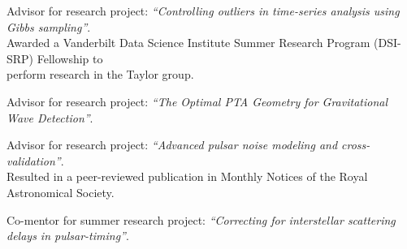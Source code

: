 \documentclass[11pt,letterpaper,sans]{moderncv}
\begin{document}
\vspace{-0.1cm}
\hspace{0.71cm} Advisor for research project: \textit{``Controlling outliers in time-series analysis using Gibbs sampling''}. \\
\vspace{-0.1cm}
\hspace{0.65cm}Awarded a Vanderbilt Data Science Institute Summer Research Program (DSI-SRP) Fellowship to \\
\vspace{-0.1cm}
\hspace{0.71cm}perform research in the Taylor group.\vspace{0.1cm}

\vspace{-0.1cm}
\hspace{0.71cm} Advisor for research project: \textit{``The Optimal PTA Geometry for Gravitational Wave Detection''}.%

\vspace{-0.1cm}
\hspace{0.71cm} Advisor for research project: \textit{``Advanced pulsar noise modeling and cross-validation''}. \\
\vspace{-0.1cm}
\hspace{0.6cm} Resulted in a peer-reviewed publication in Monthly Notices of the Royal Astronomical Society. \vspace{0.1cm}

\vspace{-0.1cm}
\hspace{0.71cm} Co-mentor for summer research project: \textit{``Correcting for interstellar scattering \\ \vspace{-0.1cm}
\hspace{0.6cm} delays in pulsar-timing''}. \vspace{0.1cm}
\end{document}
